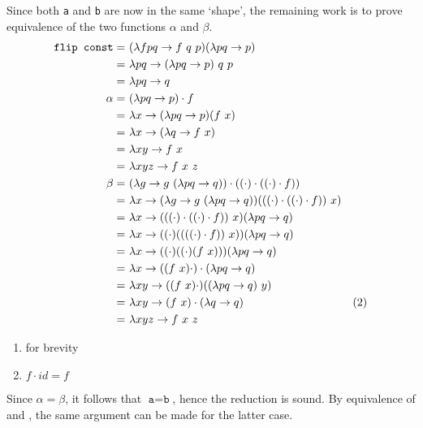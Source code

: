 Since both \texttt{a} and \texttt{b} are now in the same `shape', the remaining work is to prove equivalence of the two functions $\alpha$ and $\beta$.
\begin{align*}
    \texttt{flip const} =\ & (\lambda fpq \to f\ q\ p)(\lambda pq \to p) \\
    =\ & \lambda pq \to (\lambda pq \to p)\ q\ p \\
    =\ & \lambda pq \to q \\
    \alpha =\ & (\lambda pq \to p) \cdot f \\
    =\ & \lambda x \to (\lambda p q \to p)(f\ x) \\
    =\ & \lambda x \to (\lambda q \to f\ x) \\
    =\ & \lambda xy \to f\ x \\
    =\ & \lambda xyz \to f\ x\ z \\
    \beta =\ & (\lambda g \to g\ (\lambda pq \to q)) \cdot ((\cdot) \cdot ((\cdot) \cdot f)) \\
    =\ & \lambda x \to (\lambda g \to g\ (\lambda pq \to q))(((\cdot) \cdot ((\cdot) \cdot f))\ x) \\
    =\ & \lambda x \to (((\cdot) \cdot ((\cdot) \cdot f))\ x)(\lambda pq \to q) \\
    =\ & \lambda x \to ((\cdot) ((((\cdot) \cdot f))\ x))(\lambda pq \to q) \\
    =\ & \lambda x \to ((\cdot)((\cdot)(f\ x)))(\lambda pq \to q) \\
    =\ & \lambda x \to ((f\ x) \cdot) \cdot (\lambda pq \to q) \\
    =\ & \lambda xy \to ((f\ x) \cdot) ((\lambda pq \to q)\ y) \\
    =\ & \lambda xy \to (f\ x) \cdot (\lambda q \to q) & \text(2)\\
    =\ & \lambda xyz \to f\ x\ z
\end{align*}
\begin{enumerate}[(1)]
    \itemsep0em
    \item for brevity
    \item $f \cdot id = f$
\end{enumerate}

Since $\alpha = \beta$, it follows that $\texttt{a} = \texttt{b}$, hence the reduction is sound. By equivalence of \texttt{\apr} and \texttt{\multr}, the same argument can be made for the latter case.


